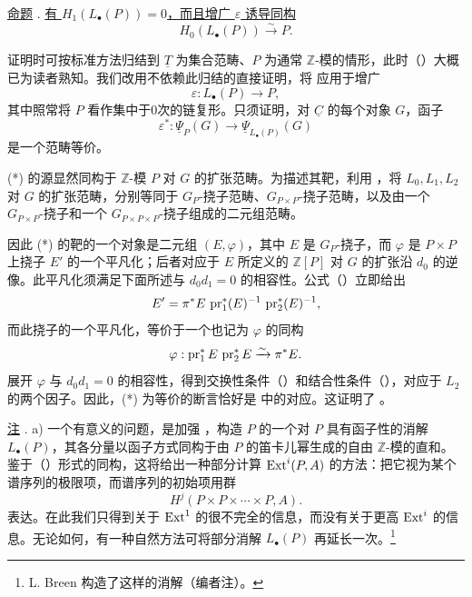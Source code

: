 \underline{命题} . \underline{有 $H_1(L_\bullet(P))=0$，而且增广 $\varepsilon$ 诱导同构}
\[
 H_0(L_\bullet(P))\xrightarrow{\sim}P.
\]


证明时可按标准方法归结到 $\underline T$ 为集合范畴、$P$ 为通常 $\mathbb Z$-模的情形，此时（）大概已为读者熟知。我们改用不依赖此归结的直接证明，将  应用于增广
\[
 \varepsilon:L_\bullet(P)\longrightarrow P,
\]
其中照常将 $P$ 看作集中于0次的链复形。只须证明，对 $\underline C$ 的每个对象 $G$，函子
\begin{equation}\tag{*}
 \varepsilon^*:\underline\Psi_P(G)\longrightarrow
 \underline\Psi_{L_\bullet(P)}(G)
\end{equation}
是一个范畴等价。

(*) 的源显然同构于 $\mathbb Z$-模 $P$ 对 $G$ 的扩张范畴。为描述其靶，利用 ，将 $L_0,L_1,L_2$ 对 $G$ 的扩张范畴，分别等同于 $G_P$-挠子范畴、$G_{P\times P}$-挠子范畴，以及由一个 $G_{P\times P}$-挠子和一个 $G_{P\times P\times P}$-挠子组成的二元组范畴。

因此 (*) 的靶的一个对象是二元组 $(E,\varphi)$，其中 $E$ 是 $G_P$-挠子，而 $\varphi$ 是 $P\times P$ 上挠子 $E'$ 的一个平凡化；后者对应于 $E$ 所定义的 $\mathbb Z[P]$ 对 $G$ 的扩张沿 $d_0$ 的逆像。此平凡化须满足下面所述与 $d_0d_1=0$ 的相容性。公式（）立即给出
\[
 E'=\pi^*E\,\operatorname{pr}_1^*(E)^{-1}\,\operatorname{pr}_2^*(E)^{-1},
\]
而此挠子的一个平凡化，等价于一个也记为 $\varphi$ 的同构
\[
 \varphi:\operatorname{pr}_1^*E\,\operatorname{pr}_2^*E\xrightarrow{\sim}\pi^*E.
\]
展开 $\varphi$ 与 $d_0d_1=0$ 的相容性，得到交换性条件（）和结合性条件（），对应于 $L_2$ 的两个因子。因此，(*) 为等价的断言恰好是  中的对应。这证明了 。

\underline{注} . a) 一个有意义的问题，是加强 ，构造 $P$ 的一个对 $P$ 具有函子性的消解 $L_\bullet(P)$，其各分量以函子方式同构于由 $P$ 的笛卡儿幂生成的自由 $\mathbb Z$-模的直和。鉴于（）形式的同构，这将给出一种部分计算 $\operatorname{Ext}^i(P,A)$ 的方法：把它视为某个谱序列的极限项，而谱序列的初始项用群
\[
 H^j(P\times P\times\cdots\times P,A).
\]
表达。在此我们只得到关于 $\operatorname{Ext}^1$ 的很不完全的信息，而没有关于更高 $\operatorname{Ext}^i$ 的信息。无论如何，有一种自然方法可将部分消解 $L_\bullet(P)$ 再延长一次。\footnote{L. Breen 构造了这样的消解（编者注）。}

